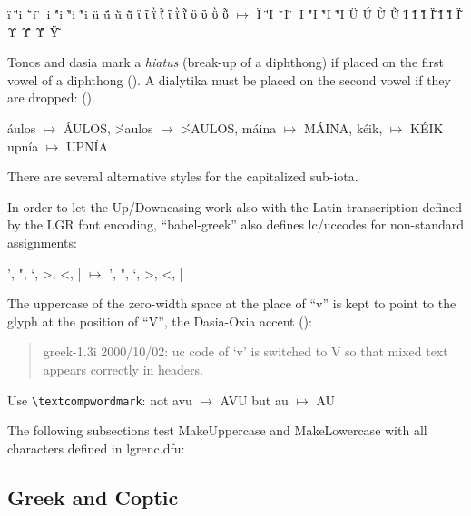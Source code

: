 \documentclass[a4paper]{article}
\begin{document}
\foreignlanguage{greek}{\"i \"'i \"`i \"~i \'"i \`"i \~"i
			\"u \"\'u \"\`u \"\~u
			ϊ ΐ ῒ ῗ ΐ ῒ ῗ ϋ ΰ ῢ ῧ
  $\mapsto$ \MakeUppercase{\"i \"'i \"`i \"~i \'"i \`"i \~"i
    	    		   \"u \"\'u \"\`u \"\~u
			   ϊ ΐ ῒ ῗ ΐ ῒ ῗ ϋ ΰ ῢ ῧ
			   }
}


Tonos and dasia mark a \emph{hiatus} (break-up of a diphthong) if
placed on the first vowel of a diphthong
().
A dialytika must be placed on the second vowel if they are dropped:
().

\'aulos $\mapsto$ \MakeUppercase{\'aulos},
\'>aulos $\mapsto$ \MakeUppercase{\'>aulos},
m\'aina $\mapsto$ \MakeUppercase{m\'aina},
k\'eik, $\mapsto$ \MakeUppercase{k\'eik}
upn\'ia $\mapsto$ \MakeUppercase{upn\'ia}

There are several alternative styles for the capitalized sub-iota.

In order to let the Up/Downcasing work also with the Latin transcription
defined by the LGR font encoding, ``babel-greek'' also defines lc/uccodes
for non-standard assignments:

', ", `, >, <, | $\mapsto$ \MakeUppercase{', ", `, >, <, |}

The uppercase of the zero-width space at the place of ``v'' is kept to point
to the glyph at the position of ``V'', the Dasia-Oxia accent
():

\begin{quotation}
  greek-1.3i 2000/10/02: uc code of `v' is switched to V
  so that mixed text appears correctly in headers.
\end{quotation}

Use \verb+\textcompwordmark+:
not \foreignlanguage{greek}{avu $\mapsto$ \MakeUppercase{avu}} but
\foreignlanguage{greek}{a\textcompwordmark u
$\mapsto$ \MakeUppercase{a\textcompwordmark u}}

The following subsections test MakeUppercase and MakeLowercase with all
characters defined in lgrenc.dfu:

\subsection{Greek and Coptic}
\end{document}
